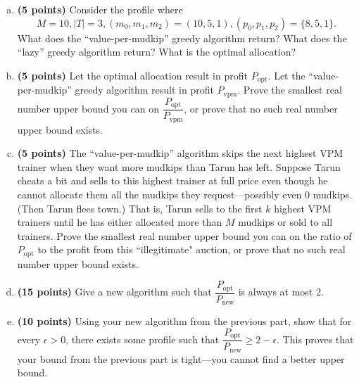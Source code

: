 \documentclass[11pt,letterpaper]{article}
\begin{document}
\begin{problem}
    \begin{enumerate}[(a)]
        \item {\bf (5 points)} Consider the profile where $$M=10, |T|=3, (m_0, m_1, m_2)=(10, 5, 1), (p_0, p_1, p_2) = \{8, 5, 1\}.$$ What does the ``value-per-mudkip'' greedy algorithm return? What does the ``lazy'' greedy algorithm return? What is the optimal allocation?
        \item {\bf (5 points)} Let the optimal allocation result in profit $P_\mathrm{opt}.$ Let the ``value-per-mudkip'' greedy algorithm result in profit $P_\mathrm{vpm}.$ Prove the smallest real number upper bound you can on $\dfrac{P_\mathrm{opt}}{P_\mathrm{vpm}}$, or prove that no such real number upper bound exists.
        \item {\bf (5 points)} The ``value-per-mudkip'' algorithm skips the next highest VPM trainer when they want more mudkips than Tarun has left. Suppose Tarun cheats a bit and sells to this highest trainer at full price even though he cannot allocate them all the mudkips they request---possibly even 0 mudkips. (Then Tarun flees town.) That is, Tarun sells to the first $k$ highest VPM trainers until he has either allocated more than $M$ mudkips or sold to all trainers. Prove the smallest real number upper bound you can on the ratio of $P_\mathrm{opt}$ to the profit from this ``illegitimate" auction, or prove that no such real number upper bound exists.
        \item {\bf (15 points)} Give a new algorithm such that $\dfrac{P_\mathrm{opt}}{P_\mathrm{new}}$ is always at most 2.
        \item {\bf (10 points)} Using your new algorithm from the previous part, show that for every $\epsilon > 0$, there exists some profile such that $\dfrac{P_{\mathrm{opt}}} {P_{\mathrm{new}}} \geq 2 - \epsilon$. This proves that your bound from the previous part is tight---you cannot find a better upper bound.
    \end{enumerate}
\end{problem}
\end{document}
